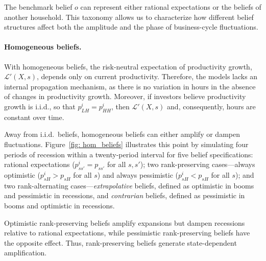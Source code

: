 \begin{definition}
\label{def: belief_taxonomy}
\end{definition}

The benchmark belief $o$ can represent either rational expectations or the beliefs of
another household. This taxonomy allows us to characterize how different belief
structures affect both the amplitude and the phase of business-cycle fluctuations.

\paragraph{Homogeneous beliefs.}

With homogeneous beliefs, the risk-neutral expectation of productivity growth,
$\mathcal L'(X,s)$, depends only on current productivity. 
Therefore, the models lacks an internal propagation mechanism, as there is no variation in hours in the absence of changes in productivity growth. 
Moreover, if
investors believe productivity growth is i.i.d., so that $p_{LH}^i=p_{HH}^i$, then
$\mathcal L'(X,s)$ and, consequently, hours are constant over time.

Away from i.i.d.\ beliefs, homogeneous beliefs can either amplify or dampen fluctuations. Figure~\ref{fig: hom_beliefs} illustrates
this point by simulating four periods of recession within a twenty-period interval for
five belief specifications: rational expectations
($p_{ss'}^i=p_{ss'}$ for all $s,s'$); two rank-preserving cases---always optimistic
($p_{sH}^i>p_{sH}$ for all $s$) and always pessimistic ($p_{sH}^i<p_{sH}$ for all $s$);
and two rank-alternating cases---\emph{extrapolative} beliefs, defined as optimistic in
booms and pessimistic in recessions, and \emph{contrarian} beliefs, defined as
pessimistic in booms and optimistic in recessions.

Optimistic rank-preserving beliefs amplify expansions but dampen recessions relative to
rational expectations, while pessimistic rank-preserving beliefs have the opposite
effect. Thus, rank-preserving beliefs generate state-dependent amplification.

